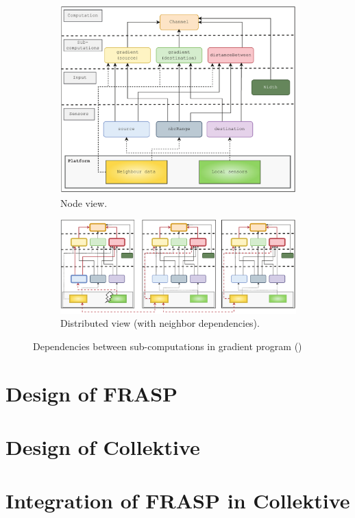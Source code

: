 \begin{figure}
    \centering
    \begin{subfigure}[b]{\textwidth}
        \centering
        \includegraphics[width=\textwidth]{figures/gradient-dependencies.png}
        \caption{Node view.}
        \label{fig:gradient-dependencies}
    \end{subfigure}
    \hfill
    \begin{subfigure}[b]{\textwidth}
        \centering
        \includegraphics[width=\textwidth]{figures/gradient-dependencies-distributed.png}
        \caption{Distributed view (with neighbor dependencies).}
        \label{fig:gradient-dependencies-distributed}
    \end{subfigure}
    \caption{Dependencies between sub-computations in gradient program ()}
\end{figure}

\section{Design of FRASP}


\section{Design of Collektive}


\section{Integration of FRASP in Collektive}